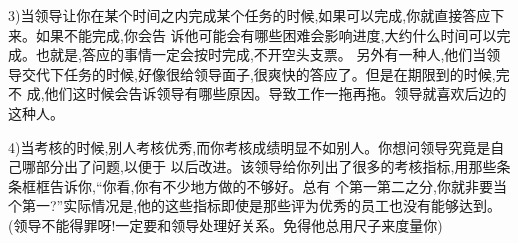 \documentclass[11pt]{article}
\begin{document}
\begin{myquote}
3)当领导让你在某个时间之内完成某个任务的时候,如果可以完成,你就直接答应下来。如果不能完成,你会告
诉他可能会有哪些困难会影响进度,大约什么时间可以完成。也就是,答应的事情一定会按时完成,不开空头支票。
另外有一种人,他们当领导交代下任务的时候,好像很给领导面子,很爽快的答应了。但是在期限到的时候,完不
成,他们这时候会告诉领导有哪些原因。导致工作一拖再拖。领导就喜欢后边的这种人。
\end{myquote}

\begin{comment}
你的问题,让我不能不再说一遍,这样的管理理念,是不成熟和低效的。但是你听了之后,你可能觉得好过一点,
但对你还是没有帮助的。

每一个人,都有一定的道德观念。如果你知道领导是这样的,你可以按这个模式操作么?我是可以的,因为
我需要尊重``传统的权威''。

这个问题,其中的一个因素,就是领导心中觉得任务是简单的,而你觉得比较复杂。我不会相信他任务简单的话,
因为我相信自己的估算。我会告诉他我的估算。

你能够有这样的信心么?你如果没有这个信心,人家是很难相信你的。
现在的问题,就是你的领导还没有对你建立起信心。所以你的问题,是如何建立他对你的信心。
这个只能通过你的绩效。那么,你需要做的,是知道如何提高你的绩效,高到一个让每个人对你都有信心的程度。

你现在达到这个境界没有?一般的员工对你的印象如何?
很大部分的解决方法,其实就是提高自己的能力。你就开始去做吧。不要太关注领导如何不成熟,如何对你不好。
你要老老实实地把自己变得大家一定对你另眼相看的。

好了,如果领导要求一些不可实现的任务,我会首先告诉他自己的想法,如果他还是坚持,我是会尊重的,
我就会真心地尽可能在他要求的条件完成。如果能够做到,我会问自己,为什么我开始的时候说不能够?
我会接受领导比我英明的结论。如果做不到,我会好像其他员工一样,告诉领导,做不到,为什么,等等。
我一定要想办法让领导知道我是已经尽力的。(这个做法有点像你投诉的员工。可能他们不是拍马屁的。可能
他们的方法是可以理解的,可能是正确的方法?)
\end{comment}

\begin{myquote}
4)当考核的时候,别人考核优秀,而你考核成绩明显不如别人。你想问领导究竟是自己哪部分出了问题,以便于
以后改进。该领导给你列出了很多的考核指标,用那些条条框框告诉你,``你看,你有不少地方做的不够好。总有
个第一第二之分,你就非要当个第一?''实际情况是,他的这些指标即使是那些评为优秀的员工也没有能够达到。
(领导不能得罪呀!一定要和领导处理好关系。免得他总用尺子来度量你)
\end{myquote}
\end{document}
